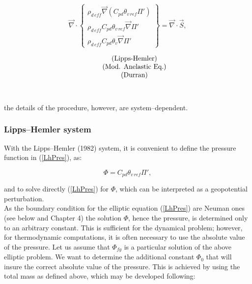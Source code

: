 %
\parbox{2cm}{
\quad
}
\hfill
\parbox{6cm}{
\begin{displaymath}
\vec{\nabla} \cdot  \left\{
\begin{array}{c}
\rho_{d\,eff}  \vec{ \nabla}(C_{pd} \theta_{v\,ref} \Pi ')\\
\rho_{d\,eff} C_{pd} \theta_{v\,ref} \vec{ \nabla} \Pi '  \\
\rho_{d\,eff} C_{pd} \theta_{v} \vec{ \nabla} \Pi '
\end{array}
\right\}  = \vec{\nabla} \cdot \vec{S},
\end{displaymath}
}
\hfill
\parbox{4cm}{
\begin{displaymath}
\begin{array}{c@{\quad}c}
\quad &\mbox{(Lipps-Hemler)} \\
\quad &\mbox{(Mod. Anelastic Eq.)} \\
\quad &\mbox{(Durran)}
\end{array}
\end{displaymath}
}
\hfill
\parbox{1cm}{
\begin{eqnarray}
\ \label{LhPres} \\ \label{MAEPres}   \\ \label{DuPres}
\end{eqnarray}
}
%

the details of the procedure, however, are system--dependent.\\

\subsubsection{Lipps--Hemler system}

With the Lipps--Hemler (1982) system, it is convenient to define the pressure
function in (\ref{LhPres}), as:

\begin{equation}
\Phi= C_{pd} \theta_{v\,ref} \Pi ',
\end{equation}

and to solve directly (\ref{LhPres}) for $\Phi$, which can be interpreted as
a geopotential perturbation.\\

As the boundary condition for the elliptic equation (\ref{LhPres}) are
Neuman ones (see below and Chapter 4) the solution $\Phi$, hence the pressure, is determined
only to an arbitrary constant. This is sufficient for the dynamical problem;
however, for thermodynamic computations, it is often necessary to use the
absolute value of the pressure.
Let us assume that $\Phi_{fg}$ is a particular solution of the above elliptic
problem. We want to
determine the additional constant $\Phi_0$ that will insure the correct
absolute value of the pressure.  This is achieved by using the total
mass as defined above, which may be developed following:

